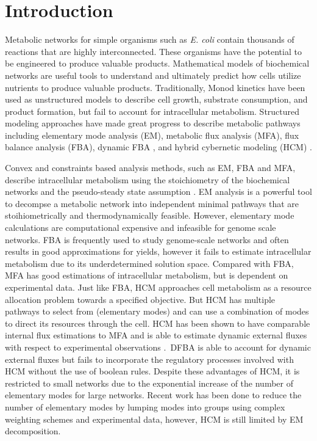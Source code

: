 \documentclass[10pt,twocolumn,twoside,final]{IEEEtran}
\begin{document}
\section{Introduction}
Metabolic networks for simple organisms such as \textit{E. coli} contain thousands of reactions that are highly interconnected.
These organisms have the potential to be engineered to produce valuable products.
Mathematical models of biochemical networks are useful tools to understand and ultimately predict how cells utilize nutrients to produce valuable products.
Traditionally, Monod kinetics have been used as unstructured models to describe cell growth, substrate consumption, and product formation, but fail to account for intracellular metabolism\cite{shuler_book}.
Structured modeling approaches have made great progress to describe metabolic pathways including elementary mode analysis (EM)\cite{2006_vonKamp_Metatool}, metabolic flux analysis (MFA), flux balance analysis (FBA)\cite{2010_orth_NatBiotech}, dynamic FBA \cite{1994_varma_palsson_ApplEnvMicro,2002_Mahadevan_BiophysJ}, and hybrid cybernetic modeling (HCM) \cite{2008_kim_varner_ramkrishna_BiotechProg}.

Convex and constraints based analysis methods, such as EM, FBA and MFA,
describe intracellular metabolism using the stoichiometry of the biochemical networks and the pseudo-steady state assumption \cite{2010_orth_NatBiotech}.
EM analysis is a powerful tool to decompse a metabolic network into independent minimal pathways that are stoihiometrically and thermodynamically feasible.
However, elementary mode calculations are computational expensive and infeasible for genome scale networks\cite{2004_lee_varner_ko_ieee}.
FBA is frequently used to study genome-scale networks\cite{2010_orth_NatBiotech} and often results in good approximations for yields, however it fails to estimate intracellular metabolism due to its underdetermined solution space.
Compared with FBA, MFA has good estimations of intracellular metabolism, but is dependent on experimental data.
Just like FBA, HCM approaches cell metabolism as a resource allocation problem towards a specified objective. But HCM has multiple pathways to select from (elementary modes) and can use a combination of modes to direct its resources through the cell.
HCM has been shown to have comparable internal flux estimations to MFA and is able to estimate dynamic external fluxes with respect to experimental observations \cite{2008_kim_varner_ramkrishna_BiotechProg}.\
DFBA is able to account for dynamic external fluxes but fails to incorporate the regulatory processes involved with HCM without the use of boolean rules\cite{2001_covert_schilling_palsson}.
Despite these advantages of HCM, it is restricted to small networks due to the exponential increase of the number of elementary modes for large networks.
Recent work has been done to reduce the number of elementary modes by lumping modes into groups using complex weighting schemes and experimental data\cite{2010_song_ramkrishna}, however, HCM is still limited by EM decomposition.
\end{document}
